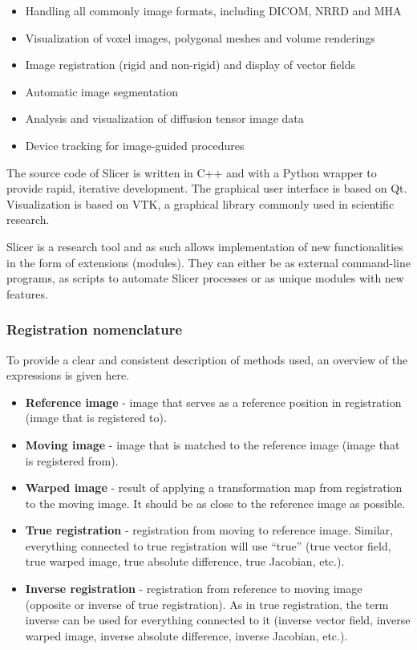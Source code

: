 \begin{itemize}
	\item Handling all commonly image formats, including DICOM, NRRD and MHA
	\item Visualization of voxel images, polygonal meshes and volume renderings
	\item Image registration (rigid and non-rigid) and display of vector fields
	\item Automatic image segmentation
	\item Analysis and visualization of diffusion tensor image data
	\item Device tracking for image-guided procedures
\end{itemize}

The source code of Slicer is written in C++ and with a Python wrapper to provide rapid, iterative development. The graphical user interface is based on Qt. Visualization is based on VTK, a graphical library commonly
used in scientific research.

Slicer is a research tool and as such allows implementation of new functionalities in the form of extensions (modules). They can either be as external command-line programs, 
as scripts to automate Slicer processes or as unique modules with new features. 

\subsubsection{Registration nomenclature}

To provide a clear and consistent description of methods used, an overview of the expressions is given here.

\begin{itemize}
 \item \textbf{Reference image} - image that serves as a reference position in registration (image that is registered to).
 \item \textbf{Moving image} - image that is matched to the reference image (image that is registered from).
 \item \textbf{Warped image} - result of applying a transformation map from registration to the moving image. It should be as close to the reference image as possible.
 \item \textbf{True registration} - registration from moving to reference image. Similar, everything connected to true registration will use ``true'' (true vector field, true warped image, true absolute difference, true Jacobian, etc.).
 \item \textbf{Inverse registration} - registration from reference to moving image (opposite or inverse of true registration). As in true registration, the term inverse can be used for everything connected to it (inverse vector field, inverse warped image, inverse absolute difference, inverse Jacobian, etc.).
\end{itemize}

